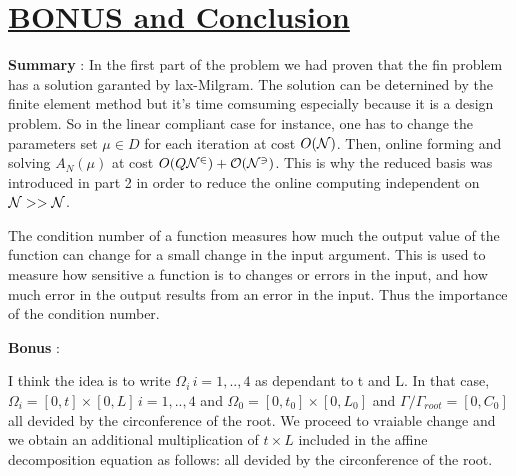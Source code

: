 \chapter[BONUS and Conclusion]{\uline{BONUS and Conclusion}}

\textbf{Summary} :
In the first part of the problem we had proven that the fin problem has a solution garanted by lax-Milgram. The solution can be deternined by the finite element method but it's time comsuming especially because it is a design problem. So in the linear compliant case for instance, one has to change the parameters set $\mu \in D$ for each iteration at cost $O(\cal N)$. Then, online forming and solving $A_N(\mu)$ at cost $O(Q \cal {N}^2) + O(\cal {N}^3)$. This is why the reduced basis was introduced in part 2 in order to reduce the online computing independent on $\cal N >> N $.

The condition number of a function measures how much the output value of the function can change for a small change in the input argument. This is used to measure how sensitive a function is to changes or errors in the input, and how much error in the output results from an error in the input. Thus the importance of the condition number.

\textbf{Bonus} :

I think the idea is to write $\Omega_i \, i=1,..,4$ as dependant to t and L. In that case, $\Omega_i = [0,t]\times [0,L] \, i=1,..,4$ and $\Omega_0 = [0,t_0]\times [0,L_0]$ and $\Gamma/\Gamma_{root} = [0,C_0]$ all devided by the circonference of the root. We proceed to vraiable change and we obtain an additional multiplication of $t \times L$ included in the affine decomposition equation as follows:
all devided by the circonference of the root.
